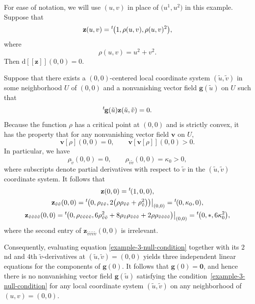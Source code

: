 \documentclass[pdftex]{sigma}
\numberwithin{equation}{section}
\renewcommand{\d}{\mathrm{d}}%
\newcommand{\mbg}{\mathbf{g}}
\newcommand{\mbv}{\mathbf{v}}
\newcommand{\mbz}{\mathbf{z}}
\begin{document}
\begin{Example}\label{critical-point-example}
For ease of notation, we will use $(u,v)$ in place of $\big(u^1, u^2\big)$ in this example.
Suppose that
\[ \mbz(u,v) = {}^t\hskip-1pt\big(1, \rho(u,v), \rho(u,v)^2\big) , \]
where
\[ \rho(u,v) = u^2 + v^2. \]
Then $\d[\![\mbz]\!](0,0) = 0$.

Suppose that there exists a $(0,0)$-centered local coordinate system $ (\tilde{u}, \tilde{v} )$ in some neighborhood $U$ of $(0,0)$ and a nonvanishing vector field $\mbg(\tilde{u})$ on $U$ such that
\begin{gather}\label{example-3-null-condition}
{}^t\hskip-1pt \mbg(\tilde{u}) \mbz(\tilde{u}, \tilde{v}) = 0.
\end{gather}
Because the function $\rho$ has a critical point at $(0,0)$ and is strictly convex, it has the property that for any nonvanishing vector field $\mbv$ on $U$,
\[ \mbv[\rho](0,0) = 0, \qquad \mbv[\mbv[\rho]](0,0) > 0. \]
In particular, we have
\[ \rho_{\tilde{v}}(0,0) = 0, \qquad \rho_{\tilde{v} \tilde{v}} (0,0) = \kappa_0 > 0, \]
where subscripts denote partial derivatives with respect to $\tilde{v}$ in the $(\tilde{u}, \tilde{v})$ coordinate system.
It follows that
\begin{gather*}
\mbz(0,0) = {}^t\hskip-1pt (1, 0, 0), \\
 \mbz_{\tilde{v} \tilde{v}}(0,0) =
{}^t\hskip-1pt \big(0, \rho_{\tilde{v} \tilde{v}}, 2\big(\rho \rho_{\tilde{v} \tilde{v}} + \rho_{\tilde{v}}^2\big) \big) \big\vert_{(0,0)} = {}^t\hskip-1pt (0, \kappa_0, 0 ), \\
\mbz_{\tilde{v} \tilde{v} \tilde{v} \tilde{v}}(0,0) =
{}^t\hskip-1pt \big(0, \rho_{\tilde{v} \tilde{v} \tilde{v} \tilde{v}},
6 \rho_{\tilde{v} \tilde{v}}^2 + 8 \rho_{\tilde{v}} \rho_{\tilde{v} \tilde{v}\tilde{v}} + 2 \rho \rho_{\tilde{v} \tilde{v} \tilde{v} \tilde{v}} \big) \big\vert_{(0,0)} =
{}^t\hskip-1pt \big(0, *, 6\kappa_0^2\big),
\end{gather*}
where the second entry of $\mbz_{\tilde{v} \tilde{v} \tilde{v} \tilde{v}}(0,0)$ is irrelevant.

Consequently, evaluating equation \eqref{example-3-null-condition} together with its $2$nd and $4$th $\tilde{v}$-de\-ri\-va\-tives at $(\tilde{u},\tilde{v}) = (0,0)$ yields three independent linear equations for the components of $\mbg(0)$. It follows that $\mbg(0) = \mathbf{0}$, and hence there is no nonvanishing vector field $\mbg(\tilde{u})$ satisfying the condition~\eqref{example-3-null-condition} for any local coordinate system $(\tilde{u}, \tilde{v})$ on any neighborhood of $(u,v) = (0,0)$.
\end{Example}
\end{document}
